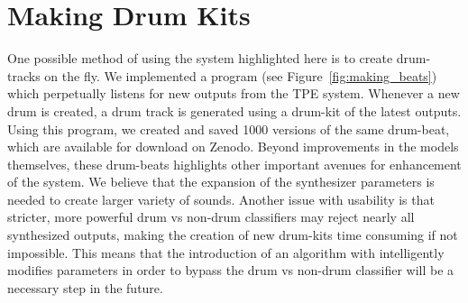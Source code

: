 \documentclass[\main/thesis.tex]{subfiles}
\begin{document}
\section{Making Drum Kits}
One possible method of using the system highlighted here is to create drum-tracks on the fly. We implemented a program (see Figure~\ref{fig:making_beats}) which perpetually listens for new outputs from the TPE system. Whenever a new drum is created, a drum track is generated using a drum-kit of the latest outputs. Using this program, we created and saved 1000 versions of the same drum-beat, which are available for download on Zenodo. Beyond improvements in the models themselves, these drum-beats highlights other important avenues for enhancement of the system. We believe that the expansion of the synthesizer parameters is needed to create larger variety of sounds. Another issue with usability is that stricter, more powerful drum vs non-drum classifiers may reject nearly all synthesized outputs, making the creation of new drum-kits time consuming if not impossible. This means that the introduction of an algorithm with intelligently modifies parameters in order to bypass the drum vs non-drum classifier will be a necessary step in the future. 
\end{document}
